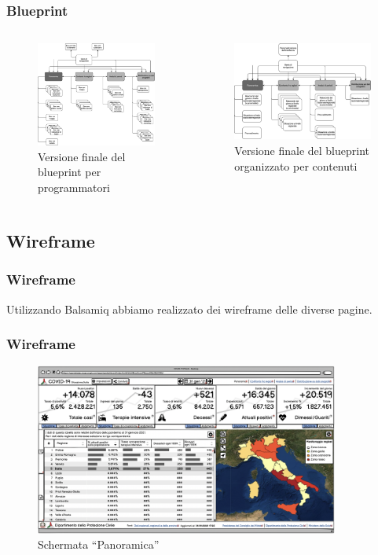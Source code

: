 \documentclass[handout]{beamer}
\begin{document}
		\begin{frame}
			\frametitle{Blueprint}
			\begin{columns}[t]
					\begin{column}[T]{5cm}
						\begin{figure}
							\includegraphics[width=5cm]{img/blueprint-prog-4}
							\caption{Versione finale del blueprint per programmatori}
						\end{figure}
					\end{column}
					\begin{column}[T]{5cm}
						\begin{figure}
							\includegraphics[width=5cm]{img/blueprint-cont-4}
							\caption{Versione finale del blueprint organizzato per contenuti}
						\end{figure}
					\end{column}
			\end{columns}
		\end{frame}


		\subsection{Wireframe}
		\begin{frame}
			\frametitle{Wireframe}
			Utilizzando Balsamiq abbiamo realizzato dei wireframe delle diverse pagine. 
		\end{frame}

		\begin{frame}
			\frametitle{Wireframe}
			\begin{figure}
				\includegraphics[width=10cm]{img/panoramica}
				\caption{Schermata ``Panoramica''}
			\end{figure}
		\end{frame}
\end{document}
